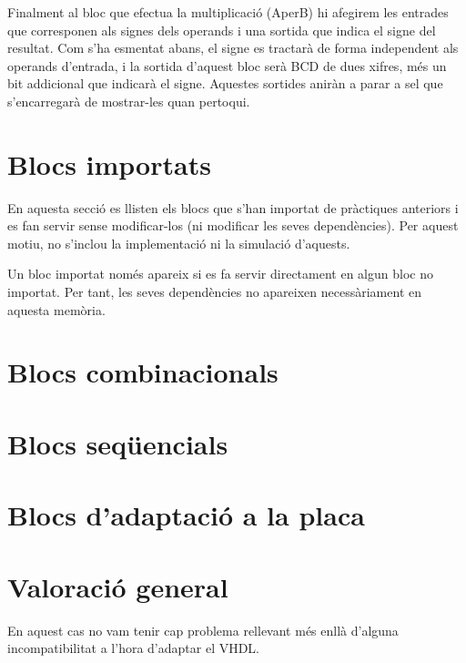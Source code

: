 Finalment al bloc que efectua la multiplicació (\textsf{AperB}) hi afegirem les entrades que corresponen als signes dels operands i una sortida que indica el signe del resultat. Com s'ha esmentat abans, el signe es tractarà de forma independent als operands d'entrada, i la sortida d'aquest bloc serà BCD de dues xifres, més un bit addicional que indicarà el signe. Aquestes sortides aniràn a parar a \textsf{sel} que s'encarregarà de mostrar-les quan pertoqui.

\section{Blocs importats}

En aquesta secció es llisten els blocs que s'han importat de pràctiques
anteriors i es fan servir sense modificar-los (ni modificar les seves 
dependències). Per aquest motiu, no s'inclou la implementació ni la   
simulació d'aquests.

Un bloc importat només apareix si es fa servir directament en algun bloc
no importat. Per tant, les seves dependències no apareixen necessàriament
en aquesta memòria.


\section{Blocs combinacionals}

\section{Blocs seqüencials}

\section{Blocs d'adaptació a la placa}

\section{Valoració general}

En aquest cas no vam tenir cap problema rellevant més enllà d'alguna incompatibilitat a l'hora d'adaptar el VHDL.


